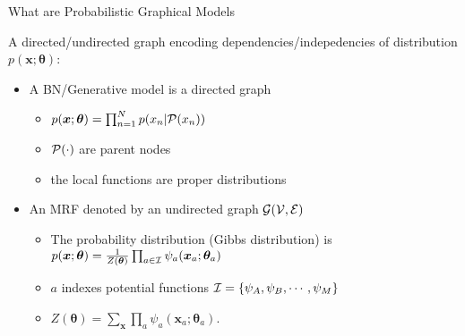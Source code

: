 \begin{frame}{What are Probabilistic Graphical Models}
  \\
  \vskip 0.8cm
  
    A directed/undirected graph encoding dependencies/indepedencies of distribution $p(\bm{x}; \bm{\theta})$:
    \begin{itemize}[label={$\bullet$}]
    \item A BN/Generative model is a directed graph
      \begin{itemize}[label={$\bullet$}]
      \item $p(\bm{x}; \bm{\theta}) = \prod_{n=1}^{N}p(x_n| \mathcal{P}(x_n))$
      \item $\mathcal{P}(\cdot)$ are parent nodes
      \item the local functions are proper distributions
      \end{itemize}
      
    \item An MRF denoted by an undirected graph $\mathcal{G}(\mathcal{V}, \mathcal{E})$
      \begin{itemize}[label=$\bullet$]
      \item The probability distribution (Gibbs distribution) is $p(\bm{x}; \bm{\theta}) = \frac{1}{Z(\bm{\theta})} \prod_{a\in\mathcal{I}} \psi_a(\bm{x}_a; \bm{\theta}_a)$
      \item  $a$ indexes potential functions $\mathcal{I}=\{\psi_A, \psi_B, \cdots, \psi_M\}$
      \item $Z(\bm{\theta}) = \sum_{\bm{x}}\prod_{a} \psi_a(\bm{x}_a;\bm{\theta}_a)$.
      \end{itemize}
    \end{itemize}
  
  
\end{frame}
